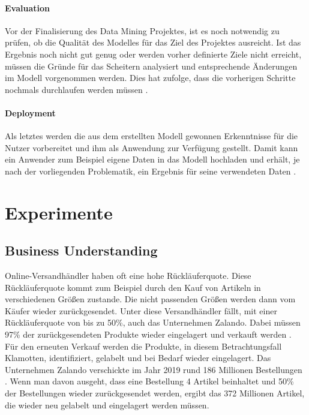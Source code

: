 \documentclass[12pt]{scrreprt}
\begin{document}
\subsubsection{Evaluation}
	
Vor der Finalisierung des Data Mining Projektes, ist es noch notwendig zu prüfen, ob die Qualität des Modelles für das Ziel des Projektes ausreicht. Ist das Ergebnis noch nicht gut genug oder werden vorher definierte Ziele nicht erreicht, müssen die Gründe für das Scheitern analysiert und entsprechende Änderungen im Modell vorgenommen werden. Dies hat zufolge, dass die vorherigen Schritte nochmals durchlaufen werden müssen \cite{Wuttke}.
	
\subsubsection{Deployment}
	
Als letztes werden die aus dem erstellten Modell gewonnen Erkenntnisse für die Nutzer vorbereitet und ihm als Anwendung zur Verfügung gestellt. Damit kann ein Anwender zum Beispiel eigene Daten in das Modell hochladen und erhält, je nach der vorliegenden Problematik, ein Ergebnis für seine verwendeten Daten \cite{Wuttke}.
	
\newpage
\chapter{Experimente}
	
\section{Business Understanding}
	
Online-Versandhändler haben oft eine hohe Rückläuferquote. Diese Rückläuferquote kommt zum Beispiel durch den Kauf von Artikeln in verschiedenen Größen zustande. Die nicht passenden Größen werden dann vom Käufer wieder zurückgesendet. Unter diese Versandhändler fällt, mit einer Rückläuferquote von bis zu 50\%, auch das Unternehmen Zalando. Dabei müssen 97\% der zurückgesendeten Produkte wieder eingelagert und verkauft werden \cite{Hoefer2018}. Für den erneuten Verkauf werden die Produkte, in diesem Betrachtungsfall Klamotten, identifiziert, gelabelt und bei Bedarf wieder eingelagert. Das Unternehmen Zalando verschickte im Jahr 2019 rund 186 Millionen Bestellungen \cite{Rabe2021}. Wenn man davon ausgeht, dass eine Bestellung 4 Artikel beinhaltet und 50\% der Bestellungen wieder zurückgesendet werden, ergibt das 372 Millionen Artikel, die wieder neu gelabelt und eingelagert werden müssen.\\
	
\end{document}
